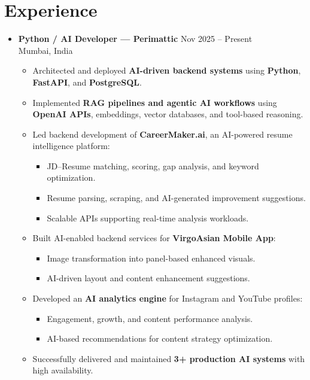 \documentclass[a4paper,11pt]{article}
\begin{document}
\section{Experience}
\begin{itemize}

\item \textbf{Python / AI Developer --- Perimattic} \hfill Nov 2025 -- Present \\
Mumbai, India
\begin{itemize}
    \item Architected and deployed \textbf{AI-driven backend systems} using \textbf{Python}, \textbf{FastAPI}, and \textbf{PostgreSQL}.
    \item Implemented \textbf{RAG pipelines and agentic AI workflows} using \textbf{OpenAI APIs}, embeddings, vector databases, and tool-based reasoning.
    \item Led backend development of \textbf{CareerMaker.ai}, an AI-powered resume intelligence platform:
    \begin{itemize}
        \item JD--Resume matching, scoring, gap analysis, and keyword optimization.
        \item Resume parsing, scraping, and AI-generated improvement suggestions.
        \item Scalable APIs supporting real-time analysis workloads.
    \end{itemize}
    \item Built AI-enabled backend services for \textbf{VirgoAsian Mobile App}:
    \begin{itemize}
        \item Image transformation into panel-based enhanced visuals.
        \item AI-driven layout and content enhancement suggestions.
    \end{itemize}
    \item Developed an \textbf{AI analytics engine} for Instagram and YouTube profiles:
    \begin{itemize}
        \item Engagement, growth, and content performance analysis.
        \item AI-based recommendations for content strategy optimization.
    \end{itemize}
    \item Successfully delivered and maintained \textbf{3+ production AI systems} with high availability.
\end{itemize}


\end{itemize}
\end{document}
